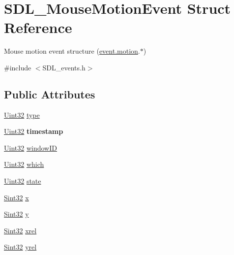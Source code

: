 \hypertarget{struct_s_d_l___mouse_motion_event}{}\section{S\+D\+L\+\_\+\+Mouse\+Motion\+Event Struct Reference}
\label{struct_s_d_l___mouse_motion_event}


Mouse motion event structure (\hyperlink{union_s_d_l___event_ac3c89e190faacbe84280cd539453bab6}{event.\+motion}.$\ast$)  




{\ttfamily \#include $<$S\+D\+L\+\_\+events.\+h$>$}

\subsection*{Public Attributes}
\begin{DoxyCompactItemize}
\item 
\hyperlink{_s_d_l__stdinc_8h_add440eff171ea5f55cb00c4a9ab8672d}{Uint32} \hyperlink{struct_s_d_l___mouse_motion_event_a431dd28cd6db6a7335cf633dbeb80cfb}{type}
\item 
\hypertarget{struct_s_d_l___mouse_motion_event_af530bc0ef327ea6d497c5b1da119841c}{}\hyperlink{_s_d_l__stdinc_8h_add440eff171ea5f55cb00c4a9ab8672d}{Uint32} {\bfseries timestamp}\label{struct_s_d_l___mouse_motion_event_af530bc0ef327ea6d497c5b1da119841c}

\item 
\hyperlink{_s_d_l__stdinc_8h_add440eff171ea5f55cb00c4a9ab8672d}{Uint32} \hyperlink{struct_s_d_l___mouse_motion_event_aa9976725242ada93a9e18e7fdf5796e6}{window\+I\+D}
\item 
\hyperlink{_s_d_l__stdinc_8h_add440eff171ea5f55cb00c4a9ab8672d}{Uint32} \hyperlink{struct_s_d_l___mouse_motion_event_a6f04c17b4305683915e2fd2dc3c36dbc}{which}
\item 
\hyperlink{_s_d_l__stdinc_8h_add440eff171ea5f55cb00c4a9ab8672d}{Uint32} \hyperlink{struct_s_d_l___mouse_motion_event_a3f6e9bad9d959b824881ba09e05b7024}{state}
\item 
\hyperlink{_s_d_l__stdinc_8h_a7a90b941db9d4582e9ad7abb9940ff7e}{Sint32} \hyperlink{struct_s_d_l___mouse_motion_event_a36398bb4a5308446a262b0bfc8baa80a}{x}
\item 
\hyperlink{_s_d_l__stdinc_8h_a7a90b941db9d4582e9ad7abb9940ff7e}{Sint32} \hyperlink{struct_s_d_l___mouse_motion_event_a7e6a7b1f8713d1968dc913908e8ea448}{y}
\item 
\hyperlink{_s_d_l__stdinc_8h_a7a90b941db9d4582e9ad7abb9940ff7e}{Sint32} \hyperlink{struct_s_d_l___mouse_motion_event_a1c01d9aba2a20778fb45a15dca39ef58}{xrel}
\item 
\hyperlink{_s_d_l__stdinc_8h_a7a90b941db9d4582e9ad7abb9940ff7e}{Sint32} \hyperlink{struct_s_d_l___mouse_motion_event_a7674c8b92d039ab948f671a180fa7b30}{yrel}
\end{DoxyCompactItemize}


